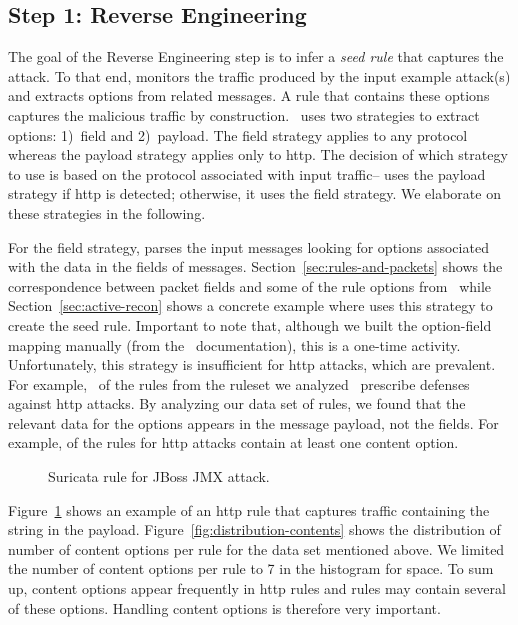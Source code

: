 \documentclass[conference]{IEEEtran}
\begin{document}
\subsection{Step 1: Reverse Engineering}
\label{sec:reverse-engineering}

The goal of the Reverse Engineering step is to infer a \emph{seed
  rule} that captures the attack. To that end, \tname{} monitors the
traffic produced by the input example attack(s) and extracts options
from related messages. A rule that contains these options captures the
malicious traffic by construction. \tname\ uses two strategies to
extract options: 1)~field and 2)~payload. The field strategy applies
to any protocol whereas the payload strategy applies only to http.
The decision of which strategy to use is based on the protocol
associated with input traffic--\tname{} uses the payload strategy if
http is detected; otherwise, it uses the field strategy. We elaborate
on these strategies in the following.

For the field strategy, \tname{} parses the input messages looking for
options associated with the data in the fields of
messages. Section~\ref{sec:rules-and-packets} shows the correspondence
between packet fields and some of the rule options from \suri\ while
Section~\ref{sec:active-recon} shows a concrete example where \tname{}
uses this strategy to create the seed rule. Important to note that,
although we built the option-field mapping manually (from the
\suri\ documentation), this is a one-time activity.  Unfortunately,
this strategy is insufficient for http attacks, which are
prevalent. For example, \percHttp\ of the \numrulessuri{} rules from
the ruleset we analyzed~\cite{emerging-threats-open} prescribe
defenses against http attacks. By analyzing our data set of rules, we
found that the relevant data for the options appears in the message
payload, not the fields. For example, \percRulesWithContent{} of the
rules for http attacks contain at least one content option.

\begin{figure}[h!]
  
  \vspace{-1ex}  
  \caption{Suricata rule for JBoss JMX attack.}
  \vspace{-2ex}  
  \label{fig:adaptor-golden-rule.suricata}
\end{figure}

Figure~\ref{fig:adaptor-golden-rule.suricata} shows an example of an
http rule that captures traffic containing the string
 in the payload.
Figure~\ref{fig:distribution-contents} shows the distribution of
number of content options per rule for the data set mentioned
above. We limited the number of content options per rule to 7 in the
histogram for space.   To sum up, content options appear
frequently in http rules and rules may contain several of these
options. Handling content options is therefore very important.
\end{document}
